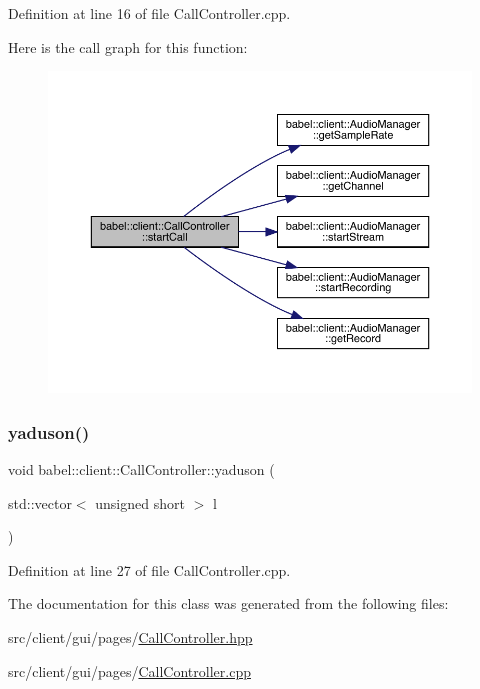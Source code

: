 Definition at line 16 of file Call\+Controller.\+cpp.

Here is the call graph for this function\+:\nopagebreak
\begin{figure}[H]
\begin{center}
\leavevmode
\includegraphics[width=350pt]{classbabel_1_1client_1_1_call_controller_ad5957a47309c9a12a5d37253c917bbb2_cgraph}
\end{center}
\end{figure}
\mbox{\label{classbabel_1_1client_1_1_call_controller_af9f55a645c329a970a5f4bb9e10109da}} 
\subsubsection{\texorpdfstring{yaduson()}{yaduson()}}
{\footnotesize\ttfamily void babel\+::client\+::\+Call\+Controller\+::yaduson (\begin{DoxyParamCaption}\item[{std\+::vector$<$ unsigned short $>$}]{l }\end{DoxyParamCaption})}



Definition at line 27 of file Call\+Controller.\+cpp.



The documentation for this class was generated from the following files\+:\begin{DoxyCompactItemize}
\item 
src/client/gui/pages/\mbox{\hyperlink{_call_controller_8hpp}{Call\+Controller.\+hpp}}\item 
src/client/gui/pages/\mbox{\hyperlink{_call_controller_8cpp}{Call\+Controller.\+cpp}}\end{DoxyCompactItemize}
